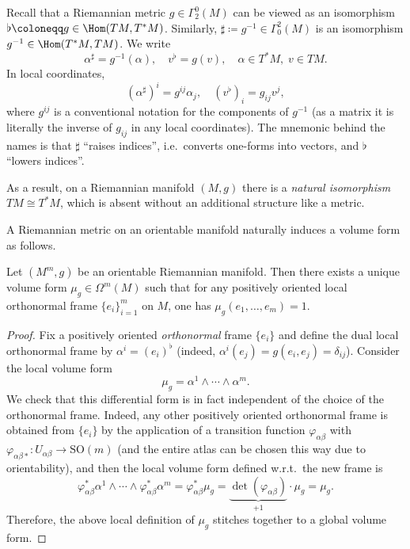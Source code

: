 \begin{defn}
    Recall that a Riemannian metric $g\in\Gamma^0_2(M)$ can be viewed as an isomorphism $\flat\coloneqq g\in\Hom(TM,T^\ast M)$. Similarly, $\sharp\coloneqq g^{-1}\in\Gamma_0^2(M)$ is an isomorphism $g^{-1}\in\Hom(T^\ast M,TM)$. We write 
    \[\alpha^\sharp=g^{-1}(\alpha),\quad v^\flat=g(v),\quad \alpha\in T^\ast M,\;v\in TM.\]
    In local coordinates,
    \[(\alpha^\sharp)^i=g^{ij}\alpha_j,\quad (v^\flat)_i=g_{ij}v^j,\]
    where $g^{ij}$ is a conventional notation for the components of $g^{-1}$ (as a matrix it is literally the inverse of $g_{ij}$ in any local coordinates). The mnemonic behind the names is that $\sharp$ ``raises indices'', i.e.\ converts one-forms into vectors, and $\flat$ ``lowers indices''.
    
    As a result, on a Riemannian manifold $(M,g)$ there is a \emph{natural isomorphism} $TM\cong T^\ast M$, which is absent without an additional structure like a metric.
\end{defn}


A Riemannian metric on an orientable manifold naturally induces a volume form as follows.


\begin{thm}
    Let $(M^m,g)$ be an orientable Riemannian manifold. Then there exists a unique volume form $\mu_g\in\Omega^m(M)$ such that for any positively oriented local orthonormal frame $\{e_i\}_{i=1}^m$ on $M$, one has $\mu_g(e_1,\ldots,e_m)=1$.
\end{thm}
\begin{proof}
    Fix a positively oriented \emph{orthonormal} frame $\{e_i\}$ and define the dual local orthonormal frame by $\alpha^i=(e_i)^\flat$ (indeed, $\alpha^i(e_j)=g(e_i,e_j)=\delta_{ij}$). Consider the local volume form
    \[\mu_g=\alpha^1\wedge \cdots\wedge \alpha^m.\]
    We check that this differential form is in fact independent of the choice of the orthonormal frame. Indeed, any other positively oriented orthonormal frame is obtained from $\{e_i\}$ by the application of a transition function $\varphi_{\alpha\beta}$ with $\varphi_{\alpha\beta\ast}:U_{\alpha\beta}\to \mathrm{SO}(m)$ (and the entire atlas can be chosen this way due to orientability), and then the local volume form defined w.r.t.\ the new frame is
    \[\varphi_{\alpha\beta}^\ast\alpha^1\wedge\cdots\wedge\varphi_{\alpha\beta}^\ast\alpha^m=\varphi_{\alpha\beta}^\ast \mu_g=\underbrace{\det(\varphi_{\alpha\beta})}_{+1}\cdot\mu_g=\mu_g.\]
    Therefore, the above local definition of $\mu_g$ stitches together to a global volume form.
\end{proof}

